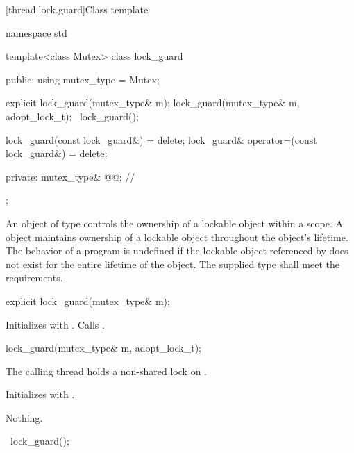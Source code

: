 [thread.lock.guard]{Class template }

%
\begin{codeblock}
namespace std {
  template<class Mutex>
  class lock_guard {
  public:
    using mutex_type = Mutex;

    explicit lock_guard(mutex_type& m);
    lock_guard(mutex_type& m, adopt_lock_t);
    ~lock_guard();

    lock_guard(const lock_guard&) = delete;
    lock_guard& operator=(const lock_guard&) = delete;

  private:
    mutex_type& @@;             // \expos
  };
}
\end{codeblock}

\pnum
An object of type  controls the ownership of a lockable object
within a scope. A  object maintains ownership of a lockable
object throughout the  object's lifetime.
The behavior of a program is undefined if the lockable object referenced by
 does not exist for the entire lifetime of the 
object. The supplied  type shall meet the 
requirements.

%
\begin{itemdecl}
explicit lock_guard(mutex_type& m);
\end{itemdecl}

\begin{itemdescr}
\pnum
\effects
Initializes  with . Calls .
\end{itemdescr}

%
\begin{itemdecl}
lock_guard(mutex_type& m, adopt_lock_t);
\end{itemdecl}

\begin{itemdescr}
\pnum
\expects
The calling thread holds a non-shared lock on .

\pnum
\effects
Initializes  with .

\pnum
\throws
Nothing.
\end{itemdescr}

%
\begin{itemdecl}
~lock_guard();
\end{itemdecl}

